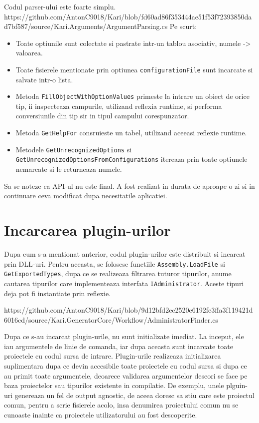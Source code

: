 \documentclass{report}
\begin{document}
Codul parser-ului este foarte simplu.
https://github.com/AntonC9018/Kari/blob/fd60ad86f353444ae51f53f72393850dad7bf587/source/Kari.Arguments/ArgumentParsing.cs
Pe scurt:

\begin{itemize}
\item
  Toate optiunile sunt colectate si pastrate intr-un tablou asociativ,
  numele -\textgreater{} valoarea.
\item
  Toate fisierele mentionate prin optiunea \texttt{configurationFile}
  sunt incarcate si salvate intr-o lista.
\item
  Metoda \texttt{FillObjectWithOptionValues} primeste la intrare un
  obiect de orice tip, ii inspecteaza campurile, utilizand reflexia
  runtime, si performa conversiunile din tip sir in tipul campului
  corespunzator.
\item
  Metoda \texttt{GetHelpFor} consruieste un tabel, utilizand aceeasi
  reflexie runtime.
\item
  Metodele \texttt{GetUnrecognizedOptions} si
  \texttt{GetUnrecognizedOptionsFromConfigurations} itereaza prin toate
  optiunele nemarcate si le returneaza numele.
\end{itemize}

Sa se noteze ca API-ul nu este final. A fost realizat in durata de
aproape o zi si in continuare ceva modificat dupa necesitatile
aplicatiei.

\section{Incarcarea plugin-urilor}

Dupa cum s-a mentionat anterior, codul plugin-urilor este distribuit si
incarcat prin DLL-uri. Pentru aceasta, se folosesc functiile
\texttt{Assembly.LoadFile} si \texttt{GetExportedTypes}, dupa ce se
realizeaza filtrarea tuturor tipurilor, anume cautarea tipurilor care
implementeaza interfata \texttt{IAdministrator}. Aceste tipuri deja pot
fi instantiate prin reflexie.

https://github.com/AntonC9018/Kari/blob/9d12bfd2ec2520e6192fe3ffa3f119421d6016cd/source/Kari.GeneratorCore/Workflow/AdministratorFinder.cs

Dupa ce s-au incarcat plugin-urile, nu sunt initializate imediat. La
inceput, ele iau argumentele de linie de comanda, iar dupa aceasta sunt
incarcate toate proiectele cu codul sursa de intrare. Plugin-urile
realizeaza initializarea suplimentara dupa ce devin accesibile toate
proiectele cu codul sursa si dupa ce au primit toate argumentele,
deoarece validarea argumentelor deseori se face pe baza proiectelor sau
tipurilor existente in compilatie. De exemplu, unele plguin-uri
genereaza un fel de output agnostic, de aceea doresc sa stiu care este
proiectul comun, pentru a scrie fisierele acolo, insa denumirea
proiectului comun nu se cunoaste inainte ca proiectele utilizatorului au
fost descoperite.
\end{document}
